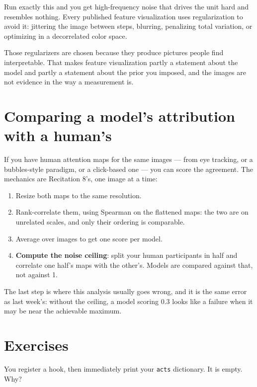 \documentclass[11pt]{article}
\begin{document}
Run exactly this and you get high-frequency noise that drives the unit hard and
resembles nothing. Every published feature visualization uses regularization to
avoid it: jittering the image between steps, blurring, penalizing total
variation, or optimizing in a decorrelated color space.

\begin{keybox}
 Those regularizers are chosen because they produce
pictures people find interpretable. That makes feature visualization partly a
statement about the model and partly a statement about the prior you imposed,
and the images are not evidence in the way a measurement is.
\end{keybox}

\section{Comparing a model's attribution with a human's}

If you have human attention maps for the same images --- from eye tracking, or a
bubbles-style paradigm, or a click-based one --- you can score the agreement.
The mechanics are Recitation 8's, one image at a time:

\begin{enumerate}
  \item Resize both maps to the same resolution.
  \item Rank-correlate them, using Spearman on the flattened maps: the two are
        on unrelated scales, and only their ordering is comparable.
  \item Average over images to get one score per model.
  \item \textbf{Compute the noise ceiling}: split your human participants in
        half and correlate one half's maps with the other's. Models are compared
        against that, not against 1.
\end{enumerate}

The last step is where this analysis usually goes wrong, and it is the same
error as last week's: without the ceiling, a model scoring $0.3$ looks like a
failure when it may be near the achievable maximum.

\section{Exercises}

 You register a hook, then immediately print your \texttt{acts}
dictionary. It is empty. Why?
\end{document}
